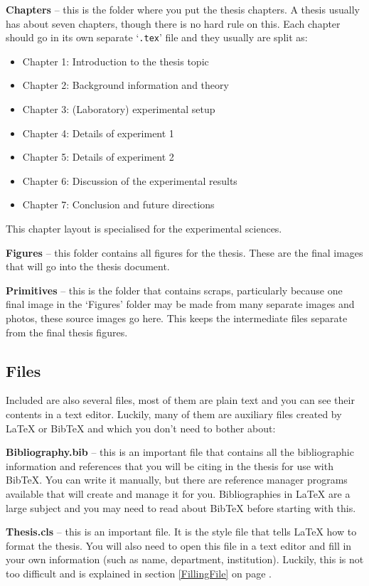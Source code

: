 \textbf{Chapters} -- this is the folder where you put the thesis chapters. A thesis usually has about seven chapters, though there is no hard rule on this. Each chapter should go in its own separate `\texttt{.tex}' file and they usually are split as:
\begin{itemize}
\item Chapter 1: Introduction to the thesis topic
\item Chapter 2: Background information and theory
\item Chapter 3: (Laboratory) experimental setup
\item Chapter 4: Details of experiment 1
\item Chapter 5: Details of experiment 2
\item Chapter 6: Discussion of the experimental results
\item Chapter 7: Conclusion and future directions
\end{itemize}
This chapter layout is specialised for the experimental sciences.

\textbf{Figures} -- this folder contains all figures for the thesis. These are the final images that will go into the thesis document.

\textbf{Primitives} -- this is the folder that contains scraps, particularly because one final image in the `Figures' folder may be made from many separate images and photos, these source images go here. This keeps the intermediate files separate from the final thesis figures.

\subsection{Files}

Included are also several files, most of them are plain text and you can see their contents in a text editor. Luckily, many of them are auxiliary files created by \LaTeX{} or BibTeX and which you don't need to bother about:

\textbf{Bibliography.bib} -- this is an important file that contains all the bibliographic information and references that you will be citing in the thesis for use with BibTeX. You can write it manually, but there are reference manager programs available that will create and manage it for you. Bibliographies in \LaTeX{} are a large subject and you may need to read about BibTeX before starting with this.

\textbf{Thesis.cls} -- this is an important file. It is the style file that tells \LaTeX{} how to format the thesis. You will also need to open this file in a text editor and fill in your own information (such as name, department, institution). Luckily, this is not too difficult and is explained in section \ref{FillingFile} on page \pageref{FillingFile}.

